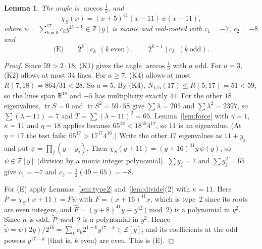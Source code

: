 \documentclass[11pt]{article}
\newtheorem{lemma}[theorem]{Lemma}
\theoremstyle{definition}
\newcommand{\Z}{\mathbb{Z}}
\newcommand{\R}{\mathbb{R}}
\newcommand{\tr}{\operatorname{tr}}
\begin{document}
\begin{lemma}\label{lem:59red}
The angle is $\arccos\frac15$, and
\[
\chi_S(x)=(x+5)^{41}(x-11)\,\psi(x-11),
\]
where $\psi=\sum_{k=0}^{17}c_ky^{17-k}\in\Z[y]$ is monic and real-rooted with $c_1=-7$, $c_2=-8$ and
\[
\text{(E)}\qquad 2^{k}\mid c_k\ \ (k\ \text{even}),\qquad 2^{k-1}\mid c_k\ \ (k\ \text{odd}).
\]
\end{lemma}
\begin{proof}
Since $59>2\cdot18$, (K1) gives the angle $\arccos\frac1a$ with $a$ odd. For $a=3$, (K2) allows at
most $34$ lines. For $a\ge7$, (K4) allows at most $R(7,18)=864/31<28$. So $a=5$. By (K4),
$N_{1/5}(17)\le R(5,17)=51<59$, so the lines span $\R^{18}$ and $-5$ has multiplicity exactly $41$. For
the other $18$ eigenvalues, $\tr S=0$ and $\tr S^2=59\cdot58$ give $\sum\lambda=205$ and
$\sum\lambda^2=2397$, so $\sum(\lambda-11)=7$ and $T=\sum(\lambda-11)^2=65$.
Lemma~\ref{lem:force} with $\gamma=1$, $\kappa=11$ and $\eta=18$ applies because
$65^{18}<18^{18}4^{17}$, so $11$ is an eigenvalue. (At $\eta=17$ the test fails:
$65^{17}>17^{17}4^{16}$.) Write the other $17$ eigenvalues as $11+y_j$ and put
$\psi=\prod_j(y-y_j)$. Then $\chi_S(y+11)=(y+16)^{41}y\,\psi(y)$, so $\psi\in\Z[y]$ (division by a
monic integer polynomial). $\sum y_j=7$ and $\sum y_j^2=65$ give $c_1=-7$ and
$c_2=\frac12(49-65)=-8$.

For (E) apply Lemmas~\ref{lem:type2} and~\ref{lem:divide}(2) with $\kappa=11$. Here
$P=\chi_S(x+11)=F\psi$ with $F=(x+16)^{41}x$, which is type~2 since its roots are even integers, and
$\widehat F=(y+8)^{41}y\equiv y^{42}\pmod2$ is a polynomial in $y^2$. Since $n$ is odd, $\widetilde P\bmod2$
is a polynomial in $y^2$. Hence $\widetilde\psi=\psi(2y)/2^{16}=\sum_kc_k2^{1-k}y^{17-k}\in\Z[y]$, and its
coefficients at the odd powers $y^{17-k}$ (that is, $k$ even) are even. This is (E).
\end{proof}
\end{document}
